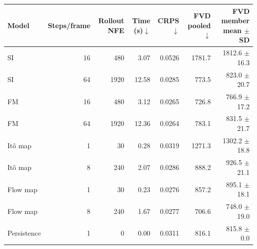 \begin{tabular}{lrrrrrr}
\toprule
Model & Steps/frame & Rollout NFE & Time (s)$\downarrow$ & CRPS$\downarrow$ & FVD pooled$\downarrow$ & FVD member mean $\pm$ SD \\
\midrule
SI & 16 & 480 & 3.07 & 0.0526 & 1781.7 & 1812.6 $\pm$ 16.3 \\
SI & 64 & 1920 & 12.58 & 0.0285 & 773.5 & 823.0 $\pm$ 20.7 \\
FM & 16 & 480 & 3.12 & 0.0265 & 726.8 & 766.9 $\pm$ 17.2 \\
FM & 64 & 1920 & 12.36 & 0.0264 & 783.1 & 831.5 $\pm$ 21.7 \\
It\^o map & 1 & 30 & 0.28 & 0.0319 & 1271.3 & 1302.2 $\pm$ 18.8 \\
It\^o map & 8 & 240 & 2.07 & 0.0286 & 888.2 & 926.5 $\pm$ 21.1 \\
Flow map & 1 & 30 & 0.23 & 0.0276 & 857.2 & 895.1 $\pm$ 18.1 \\
Flow map & 8 & 240 & 1.67 & 0.0277 & 706.6 & 748.0 $\pm$ 19.0 \\
Persistence & 1 & 0 & 0.00 & 0.0311 & 816.1 & 815.8 $\pm$ 0.0 \\
\bottomrule
\end{tabular}
